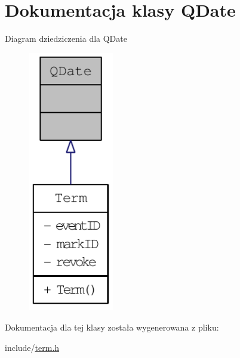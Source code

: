 \hypertarget{classQDate}{
\section{Dokumentacja klasy QDate}
\label{classQDate}
}


Diagram dziedziczenia dla QDate\nopagebreak
\begin{figure}[H]
\begin{center}
\leavevmode
\includegraphics[width=106pt]{classQDate__inherit__graph}
\end{center}
\end{figure}


Dokumentacja dla tej klasy została wygenerowana z pliku:\begin{DoxyCompactItemize}
\item 
include/\hyperlink{term_8h}{term.h}\end{DoxyCompactItemize}
